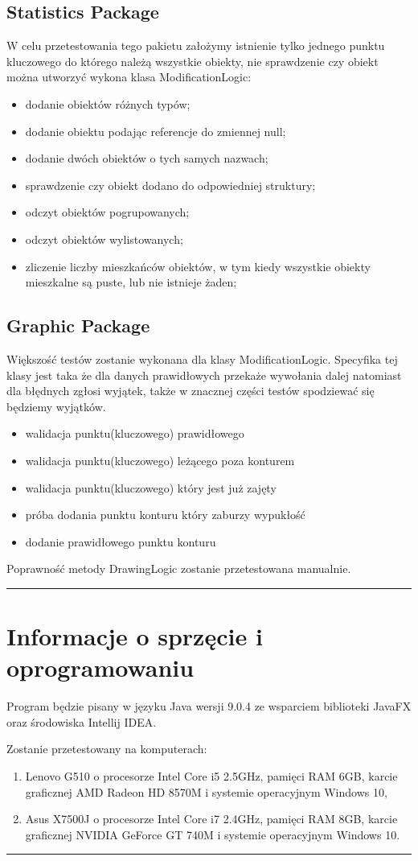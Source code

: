 \documentclass[a4paper,11pt]{article}
\newcommand{\linia}{\rule{\linewidth}{0.4mm}}
\begin{document}
\subsection{Statistics Package}
W celu przetestowania tego pakietu założymy istnienie tylko jednego punktu kluczowego do którego należą wszystkie obiekty, nie sprawdzenie czy obiekt można utworzyć wykona klasa ModificationLogic:
\begin{itemize}
\item dodanie obiektów różnych typów;
\item dodanie obiektu podając referencje do zmiennej null;
\item dodanie dwóch obiektów o tych samych nazwach;
\item sprawdzenie czy obiekt dodano do odpowiedniej struktury; 
\item odczyt obiektów pogrupowanych;
\item odczyt obiektów wylistowanych;
\item zliczenie liczby mieszkańców obiektów, w tym kiedy wszystkie obiekty mieszkalne są puste, lub nie istnieje żaden;
\end{itemize}
\subsection{Graphic Package}
Większość testów zostanie wykonana dla klasy ModificationLogic. Specyfika tej klasy jest taka że dla danych prawidłowych przekaże wywołania dalej natomiast dla błędnych zgłosi wyjątek, także w znacznej części testów spodziewać się będziemy wyjątków.
\begin{itemize}
\item walidacja punktu(kluczowego) prawidłowego
\item walidacja punktu(kluczowego) leżącego poza konturem
\item walidacja punktu(kluczowego) który jest już zajęty
\item próba dodania punktu konturu który zaburzy wypukłość
\item dodanie prawidłowego punktu konturu
\end{itemize}
Poprawność metody DrawingLogic zostanie przetestowana manualnie.

\noindent\linia
\section{Informacje o sprzęcie i oprogramowaniu}
Program będzie pisany w języku Java wersji 9.0.4 ze wsparciem biblioteki JavaFX oraz środowiska Intellij IDEA.

Zostanie przetestowany na komputerach:
\begin{enumerate}
\item Lenovo G510 o procesorze Intel Core i5 2.5GHz, pamięci RAM 6GB, karcie graficznej AMD Radeon
HD 8570M i systemie operacyjnym Windows 10,
\item Asus X7500J o procesorze Intel Core i7 2.4GHz, pamięci RAM 8GB, karcie graficznej NVIDIA GeForce GT 740M i systemie operacyjnym Windows 10. 
\end{enumerate} 
\noindent\linia
\end{document}
